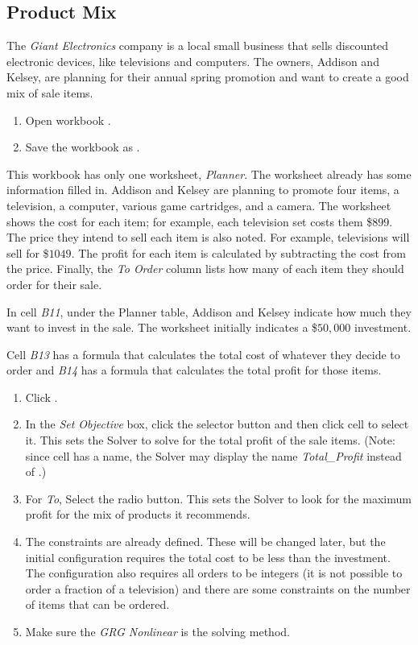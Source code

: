 \subsection{Product Mix}

The \textit{Giant Electronics} company is a local small business that sells discounted electronic devices, like televisions and computers. The owners, Addison and Kelsey, are planning for their annual spring promotion and want to create a good mix of sale items.

\begin{enumerate}
	\item Open workbook .
	\item Save the workbook as .
\end{enumerate}

This workbook has only one worksheet, \textit{Planner}. The worksheet already has some information filled in. Addison and Kelsey are planning to promote four items, a television, a computer, various game cartridges, and a camera. The worksheet shows the cost for each item; for example, each television set costs them \$$ 899 $. The price they intend to sell each item is also noted. For example, televisions will sell for \$$ 1049 $. The profit for each item is calculated by subtracting the cost from the price. Finally, the \textit{To Order} column lists how many of each item they should order for their sale.

In cell \textit{B11}, under the Planner table, Addison and Kelsey indicate how much they want to invest in the sale. The worksheet initially indicates a \$$ 50,000 $ investment.

Cell \textit{B13} has a formula that calculates the total cost of whatever they decide to order and \textit{B14} has a formula that calculates the total profit for those items.

\begin{enumerate}
	\item Click .
	\item In the \textit{Set Objective} box, click the selector button and then click cell  to select it. This sets the Solver to solve for the total profit of the sale items. (Note: since cell  has a name, the Solver may display 	the name \textit{Total\_Profit} instead of .)
	\item For \textit{To}, Select the  radio button. This sets the Solver to look for the maximum profit for the mix of products it recommends.
	\item The constraints are already defined. These will be changed later, but the initial configuration requires the total cost to be less than the investment. The configuration also requires all orders to be integers (it is not possible to order a fraction of a television) and there are some constraints on the number of items that can be ordered.
	\item Make sure the \textit{GRG Nonlinear} is the solving method.
\end{enumerate}

